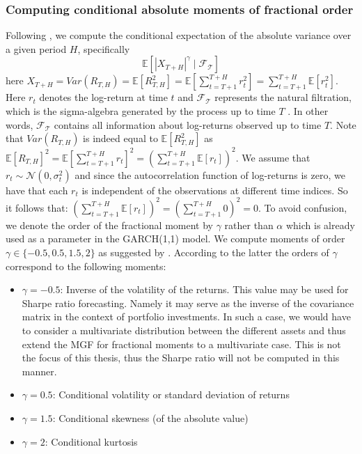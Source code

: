 \subsubsection{Computing conditional absolute moments of fractional order}\label{sssec:conditional_fractional_moments}
Following \citet{hansen2024}, we compute the conditional expectation of the absolute variance over a given period \(H\), specifically 
\begin{equation}\label{eq:expectation}
    \mathbb{E}[|X_{T + H}|^\gamma \mid \mathcal{F_T}]
\end{equation}
 here \(X_{T+H} = Var(R_{T, H}) = \mathbb{E}[R_{T, H}^2] = \mathbb{E}[\sum_{t = T + 1}^{T + H} r_t^2] = \sum_{t = T + 1}^{T + H}\mathbb{E}[ r_t^2] \). Here \(r_t\) denotes the log-return at time \(t\) and \(\mathcal{F_T}\) represents the natural filtration, which is the sigma-algebra generated by the process up to time \(T\) \citep{lowther2009}. In other words, \(\mathcal{F_T}\) contains all information about log-returns observed up to time \(T\). Note that \(Var(R_{T, H})\) is indeed equal to \(\mathbb{E}[R_{T, H}^2]\) as \(\mathbb{E}[R_{T, H}]^2 = \mathbb{E}[\sum_{t = T + 1}^{T + H} r_t]^2 = \left(\sum_{t = T + 1}^{T + H} \mathbb{E}[r_t]\right)^2\). We assume that \(r_t \sim \mathcal{N}(0, \sigma^2_t)\) and since the autocorrelation function of log-returns is zero, we have that each \(r_t\) is independent of the observations at different time indices. So it follows that: \(\left(\sum_{t = T + 1}^{T + H} \mathbb{E}[r_t]\right)^2 = \left(\sum_{t = T + 1}^{T + H} 0\right)^2 = 0\). To avoid confusion, we denote the order of the fractional moment by \(\gamma\) rather  than \(\alpha\) which is already used as a parameter in the GARCH(1,1) model. We compute moments of order \(\gamma \in \{-0.5, 0.5, 1.5, 2\}\) as suggested by \citet{hansen2024}.
According to the latter the orders of \(\gamma\) correspond to the following moments:

\begin{itemize}
\item \(\gamma = -0.5\): Inverse of the volatility of the returns. This value may be used for Sharpe ratio forecasting. Namely it may serve as the inverse of the covariance matrix in the context of portfolio investments. In such a case, we would have to consider a multivariate distribution between the different assets and thus extend the MGF for fractional moments to a multivariate case. This is not the focus of this thesis, thus the Sharpe ratio will not be computed in this manner.
\item \(\gamma = 0.5\): Conditional volatility or standard deviation of  returns
\item  \(\gamma = 1.5\): Conditional skewness (of the absolute value)
\item  \(\gamma = 2\): Conditional kurtosis
\end{itemize}

